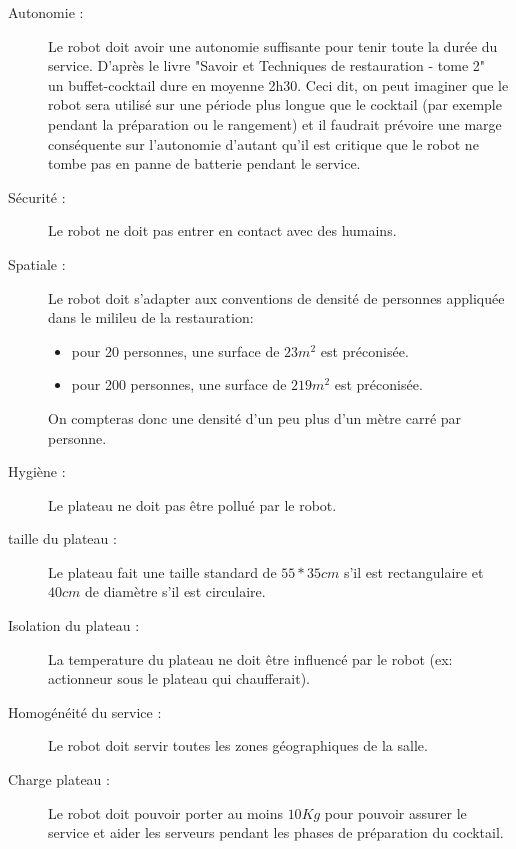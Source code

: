 \begin{description}
\item[Autonomie :] Le robot doit avoir une autonomie suffisante pour
  tenir toute la durée du service. D'après le livre "Savoir et
  Techniques de restauration - tome 2" ~\cite{Ferret200412} un buffet-cocktail dure en
  moyenne 2h30. Ceci dit, on peut imaginer que le robot sera utilisé
  sur une période plus longue que le cocktail (par exemple pendant la
  préparation ou le rangement) et il faudrait prévoire une marge
  conséquente sur l'autonomie d'autant qu'il est critique que le robot
  ne tombe pas en panne de batterie pendant le service.
\item[Sécurité :] Le robot ne doit pas entrer en contact avec des humains.
\item[Spatiale :] Le robot doit s'adapter aux conventions de densité
  de personnes appliquée dans le milileu de la restauration:
  \begin{itemize}
  \item pour 20 personnes, une surface de $23m^2$ est préconisée.
  \item pour 200 personnes, une surface de $219m^2$ est préconisée.
  \end{itemize}
  On compteras donc une densité d'un peu plus d'un mètre carré par
  personne.
\item[Hygiène :] Le plateau ne doit pas être pollué par le robot.
\item[taille du plateau :] Le plateau fait une taille standard de
  $55*35cm$ s'il est rectangulaire et $40cm$ de diamètre s'il est
  circulaire.
\item[Isolation du plateau :] La temperature du plateau ne doit être
  influencé par le robot (ex: actionneur sous le plateau qui
  chaufferait).
\item[Homogénéité du service :] Le robot doit servir toutes les zones
  géographiques de la salle.
\item[Charge plateau :] Le robot doit pouvoir porter au moins $10Kg$
  pour pouvoir assurer le service et aider les serveurs pendant les
  phases de préparation du cocktail.
\end{description}




